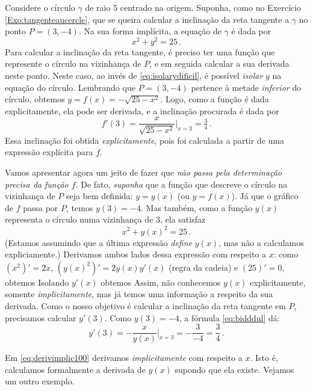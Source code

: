 \begin{ex}
Considere o círculo $\gamma$ de raio $5$ centrado na origem. 
Suponha, como no Exercício \ref{Exo:tangenteaucercle}, que se queira 
calcular a
inclinação da reta tangente a $\gamma$ no ponto $P=(3,-4)$. 
Na sua forma implícita, a equação de $\gamma$  é dada por
$$x^2+y^2=25\,.$$ 
Para calcular a inclinação da reta tangente, 
é preciso ter uma {função} que
represente o círculo na vizinhança de $P$, e em seguida calcular
a sua derivada neste ponto. 
Neste caso, ao invés de \eqref{eq:isolarydificil}, é 
possível \emph{isolar} $y$ na equação do círculo. 
Lembrando que $P=(3,-4)$ pertence à metade \emph{inferior} do círculo, 
obtemos $y=f(x)=-\sqrt{25-x^2}$.
Logo, como a função é dada explicitamente, ela pode ser derivada, e 
a inclinação procurada é dada por 
$$f'(3)=\frac{x}{\sqrt{25-x^2}}\Bigr|_{x=3}=\tfrac{3}{4}\,.$$
Essa inclinação foi obtida \emph{explicitamente}, pois foi calculada a partir
de uma expressão explícita para $f$.

Vamos apresentar agora um jeito de fazer que \emph{não passa pela 
determinação
precisa da função $f$}. De fato, \emph{suponha} que a função que descreve o
círculo na vizinhança de $P$ seja bem definida: $y=y(x)$ (ou $y=f(x)$). 
Já que o gráfico
de $f$ passa por $P$, temos $y(3)=-4$. Mas também, 
como a função $y(x)$ representa o círculo numa vizinhança de $3$, ela 
satisfaz 
$$x^2+y(x)^2=25\,.$$
(Estamos assumindo que a última expressão \emph{define} $y(x)$, mas não a
calculamos expliciamente.) Derivamos ambos lados dessa expressão
com respeito a $x$: como 
$(x^2)'=2x$, $(y(x)^2)'=2y(x)y'(x)$ (regra da cadeia) e
$(25)'=0$, obtemos
Isolando $y'(x)$ obtemos 
Assim, não conhecemos $y(x)$ explicitamente, somente 
\emph{implicitamente}, mas já temos uma informação a respeito da sua 
derivada.
Como o nosso objetivo é calcular a inclinação da reta tangente em $P$,
precisamos calcular 
$y'(3)$. Como $y(3)=-4$, a fórmula \eqref{eq:bidddul} dá:
$$y'(3)
=-\frac{x}{y(x)}\Big|_{x=3}=
-\frac{3}{-4}=\frac34\,.$$ 
\end{ex}

Em \eqref{eq:derivimplic100} derivamos \emph{implicitamente} com respeito a
$x$. Isto é, calculamos formalmente a derivada de $y(x)$ supondo que ela 
existe. Vejamos um outro exemplo.

